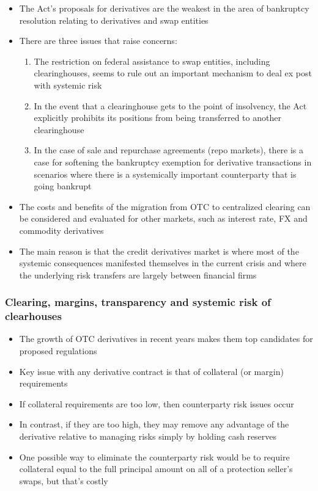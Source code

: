 \documentclass[11pt]{beamer}
\begin{document}
\begin{frame}
\begin{itemize}
\item The Act’s proposals for derivatives are the weakest in the area of bankruptcy resolution relating to derivatives and swap entities \item There are three issues that raise concerns:
\begin{enumerate}
\item The restriction on federal assistance to swap entities, including
clearinghouses, seems to rule out an important mechanism to deal ex post with systemic risk
\item In the event that a clearinghouse gets to the point of insolvency, the Act explicitly prohibits its positions from being transferred to another clearinghouse
\item In the case of sale and repurchase agreements (repo markets), there is a case for softening the bankruptcy exemption for derivative transactions in scenarios where there is a systemically important counterparty that is going bankrupt
\end{enumerate}
\end{itemize}
\end{frame}

\begin{frame}
\begin{itemize}
\item The costs and benefits of the migration from OTC to centralized clearing can be considered and evaluated for other markets, such as interest rate, FX and commodity derivatives
\item The main reason is that the credit derivatives market is where most of the systemic consequences manifested themselves in the current crisis and where the underlying risk transfers are largely between financial firms
\end{itemize}
\end{frame}

\begin{frame}
\frametitle{Clearing, margins, transparency and systemic risk of clearhouses}
\begin{itemize}
\item The growth of OTC derivatives in recent years makes them top candidates for proposed regulations
\item Key issue with any derivative contract is that of collateral (or margin) requirements
\item If collateral requirements are too low, then counterparty risk issues occur
\item In contrast, if they are too high, they may remove any advantage
of the derivative relative to managing risks simply by holding cash reserves
\item One possible way to eliminate the counterparty risk would be to require collateral equal to the full principal amount on all of a protection seller’s swaps, but that's costly
\end{itemize}
\end{frame}
\end{document}
